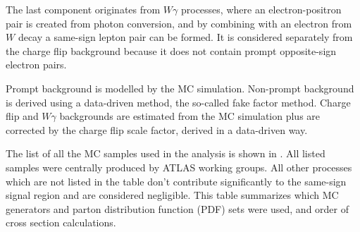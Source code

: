The last component originates from $W\gamma$ processes, where an electron-positron pair is created from photon conversion, and by combining with an electron from $W$ decay
a same-sign lepton pair can be formed. It is considered separately from the charge flip background because it does not contain prompt opposite-sign electron pairs.

Prompt background is modelled by the MC simulation. 
Non-prompt background is derived using a data-driven method, the so-called fake factor method.
Charge flip and $W\gamma$ backgrounds are estimated from the MC simulation plus are corrected by the charge flip scale factor, derived in a data-driven way.

The list of all the MC samples used in the analysis is shown in . 
All listed samples were centrally produced by ATLAS working groups.
All other processes which are not listed in the table don't contribute
significantly to the same-sign signal region and are considered negligible.
This table summarizes which MC generators and parton distribution function (PDF) sets were used, and order of cross section calculations.


